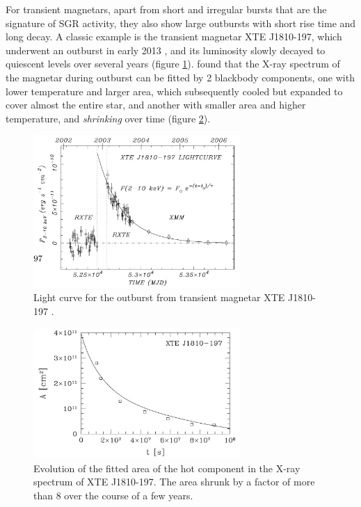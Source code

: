 For transient magnetars, apart from short and irregular bursts that are the
signature of SGR activity, they also show large outbursts with short rise time
and long decay. A classic example is the transient magnetar XTE J1810-197, which
underwent an outburst in early 2013 \citep{ibrahim_discovery_2004}, and its
luminosity slowly decayed to quiescent levels over several years (figure
\ref{fig:outburst-light-curve}). \citet{gotthelf_anatomy_2007} found that the
X-ray spectrum of the magnetar during outburst can be fitted by 2 blackbody
components, one with lower temperature and larger area, which subsequently cooled
but expanded to cover almost the entire star, and another with smaller area and
higher temperature, and {\it shrinking} over time (figure \ref{fig:shrinking-hotspot}).

\begin{figure}[h]
  \centering
  \includegraphics[width=0.7\textwidth]{pics/intro/transient.png}
  \caption[Light curve for the outburst from transient magnetar XTE J1810-197]{Light curve for the outburst from transient magnetar XTE J1810-197 \citep{gotthelf_anatomy_2007}.}
  \label{fig:outburst-light-curve}
\end{figure}

\begin{figure}[h]
  \centering
  \includegraphics[width=0.7\textwidth]{pics/intro/shrink-spot.png}
  \caption[Evolution of the fitted area of the hot component in the X-ray
    spectrum of XTE J1810-197.]{Evolution of the fitted area of the hot component in the X-ray
    spectrum of XTE J1810-197. The area shrunk by a factor of more than 8 over
    the course of a few years.}
  \label{fig:shrinking-hotspot}
\end{figure}

